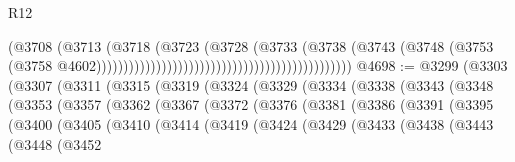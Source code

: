 \begin{lexlean}{R12}
\begin{coremodule}
                                                                            (@3708
                                                                              (@3713
                                                                                (@3718
                                                                                  (@3723
                                                                                    (@3728
                                                                                      (@3733
                                                                                        (@3738
                                                                                          (@3743
                                                                                            (@3748
                                                                                              (@3753
                                                                                                (@3758
                                                                                                  @4602)))))))))))))))))))))))))))))))))))))))))))))))
@4698 := @3299
    (@3303
      (@3307
        (@3311
          (@3315
            (@3319
              (@3324
                (@3329
                  (@3334
                    (@3338
                      (@3343
                        (@3348
                          (@3353
                            (@3357
                              (@3362
                                (@3367
                                  (@3372
                                    (@3376
                                      (@3381
                                        (@3386
                                          (@3391
                                            (@3395
                                              (@3400
                                                (@3405
                                                  (@3410
                                                    (@3414
                                                      (@3419
                                                        (@3424
                                                          (@3429
                                                            (@3433
                                                              (@3438
                                                                (@3443
                                                                  (@3448
                                                                    (@3452

\end{coremodule}
\end{lexlean}
